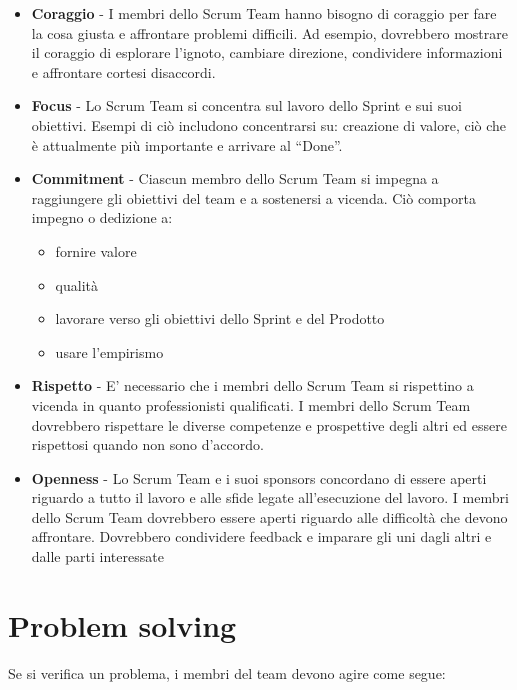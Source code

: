 \documentclass{article}
\begin{document}
\begin{itemize}
    \item \textbf{Coraggio} - I membri dello Scrum Team hanno bisogno di coraggio per fare la cosa giusta e affrontare problemi difficili. 
    Ad esempio, dovrebbero mostrare il coraggio di esplorare l'ignoto, cambiare direzione, condividere informazioni e affrontare cortesi disaccordi.
    
    \item \textbf{Focus} - Lo Scrum Team si concentra sul lavoro dello Sprint e sui suoi obiettivi. 
    Esempi di ciò includono concentrarsi su: creazione di valore, ciò che è attualmente più importante e arrivare al ``Done''.
    
    \item \textbf{Commitment} - Ciascun membro dello Scrum Team si impegna a raggiungere gli obiettivi del team e a sostenersi a vicenda. 
    Ciò comporta impegno o dedizione a:
    \begin{itemize}
        \item fornire valore
        \item qualità
        \item lavorare verso gli obiettivi dello Sprint e del Prodotto
        \item usare l'empirismo
    \end{itemize}

    
    \item \textbf{Rispetto} - E' necessario che i membri dello Scrum Team si rispettino a vicenda in quanto professionisti qualificati. 
    I membri dello Scrum Team dovrebbero rispettare le diverse competenze e prospettive degli altri ed essere rispettosi quando non sono d'accordo.
     
    \item \textbf{Openness} - Lo Scrum Team e i suoi sponsors concordano di essere aperti riguardo a tutto il lavoro e alle sfide legate all'esecuzione del lavoro.
    I membri dello Scrum Team dovrebbero essere aperti riguardo alle difficoltà che devono affrontare. Dovrebbero condividere feedback e imparare gli uni 
    dagli altri e dalle parti interessate
\end{itemize}

\section{Problem solving}
Se si verifica un problema, i membri del team devono agire come segue:
\end{document}
